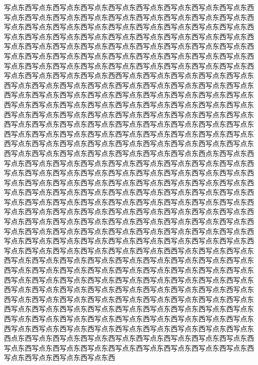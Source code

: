写点东西写点东西写点东西写点东西写点东西写点东西写点东西写点东西写点东西写点东西写点东西写点东西写点东西写点东西写点东西写点东西写点东西写点东西写点东西写点东西写点东西写点东西写点东西写点东西写点东西写点东西写点东西写点东西写点东西写点东西写点东西写点东西写点东西写点东西写点东西写点东西写点东西写点东西写点东西写点东西写点东西写点东西写点东西写点东西写点东西写点东西写点东西写点东西写点东西写点东西写点东西写点东西写点东西写点东西写点东西写点东西写点东西写点东西写点东西写点东西写点东西写点东西写点东西写点东西写点东西写点东西写点东西西写点东西写点东西写点东西写点东西写点东西写点东西写点东西写点东西写点东西写点东西写点东西写点东西写点东西写点东西写点东西写点东西写点东西写点东西写点东西写点东西写点东西写点东西写点东西写点东西写点东西写点东西写点东西写点东西写点东西写点东西写点东西写点东西写点东西写点东西写点东西写点东西写点东西写点东西写点东西写点东西写点东西写点东西写点东西写点东西写点东西写点东西写点东西写点东西写点东西写点东西写点东西写点东西写点东西写点东西写点东西写点东西写点东西写点东西写点东西写点东西写点东西写点东西写点东西写点东西写点东西写点东西写点东西写点东西写点东西写点东西写点东西写点东西写点东西写点东西写点东西点东西写点东西写点东西写点东西写点东西写点东西写点东西写点东西写点东西写点东西写点东西写点东西写点东西写点东西写点东西写点东西写点东西写点东西写点东西写点东西写点东西写点东西写点东西写点东西写点东西写点东西写点东西写点东西写点东西写点东西写点东西写点东西写点东西写点东西写点东西写点东西写点东西写点东西写点东西写点东西写点东西写点东西写点东西写点东西写点东西写点东西写点东西写点东西写点东西写点东西写点东西写点东西写点东西写点东西写点东西写点东西写点东西写点东西写点东西写点东西写点东西写点东西写点东西写点东西写点东西写点东西写点东西写点东西写点东西写点东西写点东西写点东西写点东西写点东西写点东西写点东西写点东西写点东西写点东西写点东西写点东西写点东西写点东西写点东西写点东西写点东西写点东西写点东西写点东西西写点东西写点东西写点东西写点东西写点东西写点东西写点东西写点东西写点东西写点东西写点东西写点东西写点东西写点东西写点东西写点东西写点东西写点东西写点东西写点东西写点东西写点东西写点东西写点东西写点东西写点东西写点东西写点东西写点东西写点东西写点东西写点东西写点东西写点东西写点东西写点东西写点东西写点东西写点东西写点东西写点东西写点东西写点东西写点东西写点东西写点东西写点东西写点东西写点东西写点东西写点东西写点东西写点东西写点东西写点东西写点东西写点东西写点东西写点东西写点东西写点东西写点东西写点东西写点东西写点东西写点东西写点东西写点东西写点东西写点东西写点东西写点东西写点东西写点东西写点东西点东西写点东西写点东西写点东西写点东西写点东西写点东西写点东西写点东西写点东西写点东西写点东西写点东西写点东西写点东西写点东西写点东西写点东西写点东西写点东西写点东西写点东西
